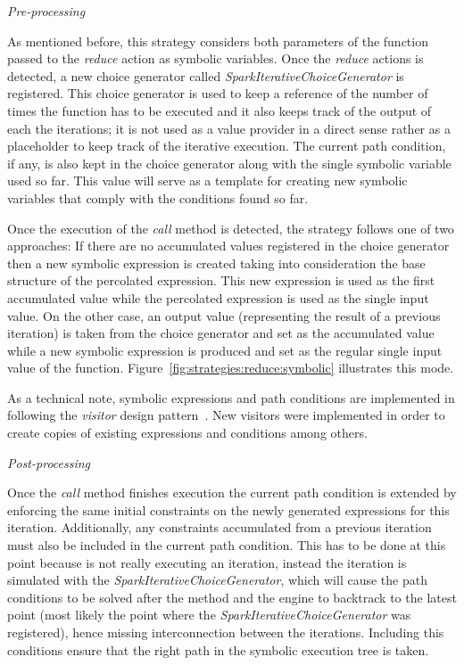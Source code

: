 \textit{Pre-processing}

As mentioned before, this strategy considers both parameters of the function passed to the \textit{reduce} action as symbolic variables. Once the \textit{reduce} actions is detected, a new choice generator called \textit{SparkIterativeChoiceGenerator} is registered. This choice generator is used to keep a reference of the number of times the function has to be executed and it also keeps track of the output of each the iterations; it is not used as a value provider in a direct sense rather as a placeholder to keep track of the iterative execution. The current path condition, if any, is also kept in the choice generator along with the single symbolic variable used so far. This value will serve as a template for creating new symbolic variables that comply with the conditions found so far.

Once the execution of the \textit{call} method is detected, the strategy follows one of two approaches: If there are no accumulated values registered in the choice generator then a new symbolic expression is created taking into consideration the base structure of the percolated expression. This new expression is used as the first accumulated value while the percolated expression is used as the single input value. On the other case, an output value (representing the result of a previous iteration) is taken from the choice generator and set as the accumulated value while a new symbolic expression is produced and set as the regular single input value of the function. Figure~\ref{fig:strategies:reduce:symbolic} illustrates this mode.

As a technical note, symbolic expressions and path conditions are implemented in \spf{} following the \textit{visitor} design pattern~\cite{Gamma1994}. New visitors were implemented in order to create copies of existing expressions and conditions among others.

\textit{Post-processing}

Once the \textit{call} method finishes execution the current path condition is extended by enforcing the same initial constraints on the newly generated expressions for this iteration. Additionally, any constraints accumulated from a previous iteration must also be included in the current path condition. This has to be done at this point because \jpf{} is not really executing an iteration, instead the iteration is simulated with the \textit{SparkIterativeChoiceGenerator}, which will cause the path conditions to be solved after the method and the engine to backtrack to the latest point (most likely the point where the \textit{SparkIterativeChoiceGenerator} was registered), hence missing interconnection between the iterations. Including this conditions ensure that the right path in the symbolic execution tree is taken.

